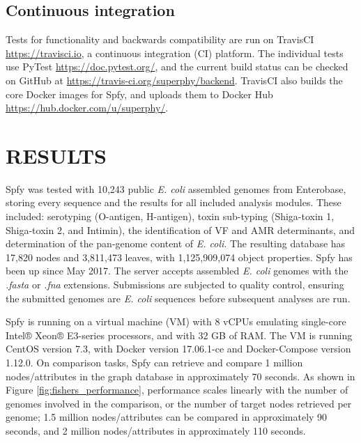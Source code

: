 \documentclass{article}
\begin{document}
\subsection{Continuous integration}


Tests for functionality and backwards compatibility are run on TravisCI \url{https://travisci.io}, a continuous integration (CI) platform.
The individual tests use PyTest \url{https://doc.pytest.org/}, and the current build status can be checked on GitHub at \url{https://travis-ci.org/superphy/backend}.
TravisCI also builds the core Docker images for Spfy, and uploads them to Docker Hub \url{https://hub.docker.com/u/superphy/}.

\section{RESULTS}
Spfy was tested with 10,243 public \textit{E. coli} assembled genomes from Enterobase, storing every sequence and the results for all included analysis modules. These included: serotyping (O-antigen, H-antigen), toxin sub-typing (Shiga-toxin 1, Shiga-toxin 2, and Intimin), the identification of VF and AMR determinants, and determination of the pan-genome content of \textit{E. coli}.
The resulting database has 17,820 nodes and 3,811,473 leaves, with 1,125,909,074 object properties.
Spfy has been up since May 2017. The server accepts assembled \textit{E. coli} genomes with the \textit{.fasta} or \textit{.fna} extensions. Submissions are subjected to quality control, ensuring the submitted genomes are \textit{E. coli} sequences before subsequent analyses are run.
\par


Spfy is running on a virtual machine (VM) with 8 vCPUs emulating single-core Intel® Xeon® E3-series processors, and with 32 GB of RAM.
The VM is running CentOS version 7.3, with Docker version 17.06.1-ce and Docker-Compose version 1.12.0.
On comparison tasks, Spfy can retrieve and compare 1 million nodes/attributes in the graph database in approximately 70 seconds.
As shown in Figure \ref{fig:fishers_performance}, performance scales linearly with the number of genomes involved in the comparison, or the number of target nodes retrieved per genome; 1.5 million nodes/attributes can be compared in approximately 90 seconds, and 2 million nodes/attributes in approximately 110 seconds.
\end{document}
